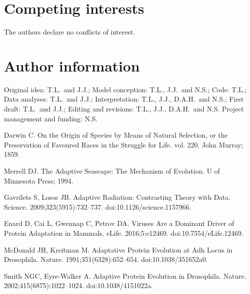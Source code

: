 \documentclass{article}
\begin{document}
    \section*{Competing interests}
    The authors declare no conflicts of interest.

    \section*{Author information}
    Original idea: T.L.\ and J.J.;
    Model conception: T.L., J.J.\ and N.S.;
    Code: T.L.;
    Data analyses: T.L.\ and J.J.;
    Interpretation: T.L., J.J., D.A.H.\ and N.S.;
    First draft: T.L.\ and J.J.;
    Editing and revisions: T.L., J.J., D.A.H.\ and N.S.
    Project management and funding: N.S\@.

    \begin{thebibliography}{10}

        Darwin C.
        \newblock On the {{Origin}} of {{Species}} by {{Means}} of {{Natural
        Selection}}, or the {{Preservation}} of {{Favoured Races}} in the
            {{Struggle}} for {{Life}}. vol. 220.
        \newblock John Murray; 1859.

        Merrell DJ.
        \newblock The {{Adaptive Seascape}}: {{The Mechanism}} of {{Evolution}}.
        \newblock U of Minnesota Press; 1994.

        Gavrilets S, Losos JB.
        \newblock Adaptive {{Radiation}}: {{Contrasting Theory}} with {{Data}}.
        \newblock Science. 2009;323(5915):732--737.
        \newblock doi:{10.1126/science.1157966}.

        Enard D, Cai L, Gwennap C, Petrov DA.
        \newblock Viruses Are a Dominant Driver of Protein Adaptation in Mammals.
        \newblock eLife. 2016;5:e12469.
        \newblock doi:{10.7554/eLife.12469}.

        McDonald JH, Kreitman M.
        \newblock Adaptative Protein Evolution at {{Adh}} Locus in {{Drosophila}}.
        \newblock Nature. 1991;351(6328):652--654.
        \newblock doi:{10.1038/351652a0}.

        Smith NGC, {Eyre-Walker} A.
        \newblock Adaptive Protein Evolution in {{Drosophila}}.
        \newblock Nature. 2002;415(6875):1022--1024.
        \newblock doi:{10.1038/4151022a}.


\end{thebibliography}
\end{document}

